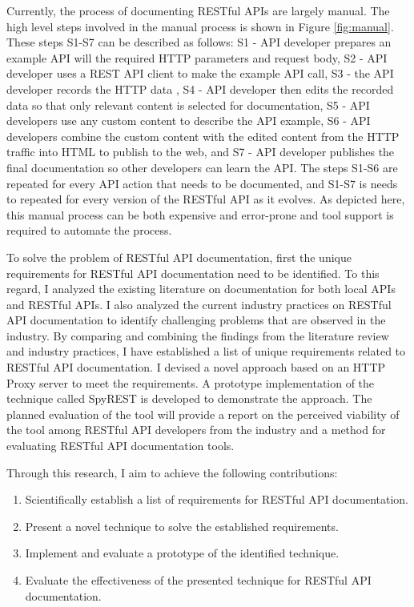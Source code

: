 \documentclass[11pt,oneside]{book}
\begin{document}
Currently, the process of documenting RESTful APIs are largely manual. The high level steps involved in the manual process is shown in Figure \ref{fig:manual}. These steps S1-S7 can be described as follows: S1 - API developer prepares an example API will the required HTTP parameters and request body, S2 - API developer uses a REST API client to make the example API call, S3 - the API developer records the HTTP data , S4 - API developer then edits the recorded data so that only relevant content is selected for documentation, S5 - API developers use any custom content to describe the API example, S6 - API developers combine the custom content with the edited content from the HTTP traffic into HTML to publish to the web, and S7 - API developer publishes the final documentation so other developers can learn the API. The steps S1-S6 are repeated for every API action that needs to be documented, and S1-S7 is needs to repeated for every version of the RESTful API as it evolves. As depicted here, this manual process can be both expensive and error-prone and tool support is required to automate the process.

To solve the problem of RESTful API documentation, first the unique requirements for RESTful API documentation need to be identified. To this regard, I analyzed the existing literature on documentation for both local APIs and RESTful APIs. I also analyzed the current industry practices on RESTful API documentation to identify challenging problems that are observed in the industry. By comparing and combining the findings from the literature review and industry practices, I have established a list of unique requirements related to RESTful API documentation. I devised a novel approach based on an HTTP Proxy server to meet the requirements. A prototype implementation of the technique called SpyREST is developed to demonstrate the approach. The planned evaluation of the tool will provide a report on the perceived viability of the tool among RESTful API developers from the industry and a method for evaluating RESTful API documentation tools.

Through this research, I aim to achieve the following contributions:
\begin{enumerate}
  \item Scientifically establish a list of requirements for RESTful API documentation.
  \item Present a novel technique to solve the established requirements.
  \item Implement and evaluate a prototype of the identified technique.
  \item Evaluate the effectiveness of the presented technique for RESTful API documentation.
\end{enumerate}
\end{document}
